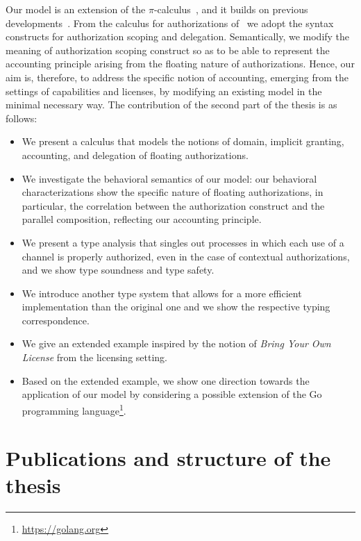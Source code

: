 Our model is an extension of the $\pi$-calculus~\cite{pi_calculus},  
and it builds on previous developments~\cite{DBLP:journals/corr/GhilezanJPPV16, clar:eke}. 
From the calculus for authorizations of~\cite{DBLP:journals/corr/GhilezanJPPV16} we adopt the syntax constructs for authorization scoping and delegation. 
Semantically, we modify the meaning of authorization scoping construct so as to be able to represent the accounting principle arising from the floating nature of authorizations. Hence, our aim is, therefore, to address  the specific notion of accounting, emerging from the settings of capabilities and licenses, by modifying an existing  model in the minimal necessary way.
%
The contribution of the second part of the thesis is as follows:
\begin{itemize}
\item We present a calculus that models the notions of domain, implicit granting, accounting, and delegation of floating authorizations.  
%
\item We investigate the behavioral semantics of our model: our behavioral characterizations show the specific nature of floating authorizations, in particular, the correlation between the authorization construct and the parallel composition, reflecting our accounting principle. 
%
\item We present a type analysis that singles out processes in which each use of a channel is properly authorized, even in the case of contextual authorizations, and we show type soundness and type safety. 
%
\item We introduce another type system that allows for a more efficient implementation than the original one and we show the respective typing correspondence.
%
\item We give an extended example inspired by the notion of \emph{Bring Your Own License} from the licensing setting.
%
\item Based on the extended example, we show one direction towards the application of our model by considering a possible extension of the Go programming language\footnote{\url{https://golang.org}}.
\end{itemize}





\section{Publications and structure of the thesis}

